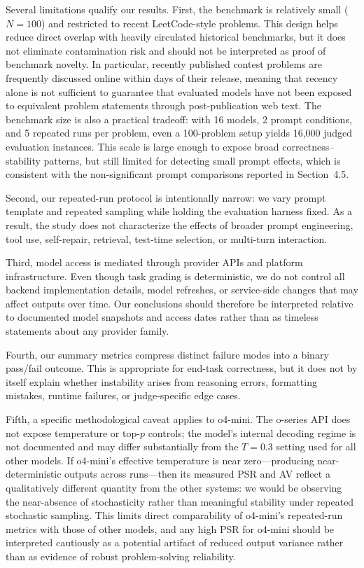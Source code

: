\documentclass[11pt,a4paper]{article}
\begin{document}
Several limitations qualify our results. First, the benchmark is relatively small ($N=100$) and restricted to recent LeetCode-style problems. This design helps reduce direct overlap with heavily circulated historical benchmarks, but it does not eliminate contamination risk and should not be interpreted as proof of benchmark novelty. In particular, recently published contest problems are frequently discussed online within days of their release, meaning that recency alone is not sufficient to guarantee that evaluated models have not been exposed to equivalent problem statements through post-publication web text. The benchmark size is also a practical tradeoff: with 16 models, 2 prompt conditions, and 5 repeated runs per problem, even a 100-problem setup yields 16{,}000 judged evaluation instances. This scale is large enough to expose broad correctness--stability patterns, but still limited for detecting small prompt effects, which is consistent with the non-significant prompt comparisons reported in Section~4.5.

Second, our repeated-run protocol is intentionally narrow: we vary prompt template and repeated sampling while holding the evaluation harness fixed. As a result, the study does not characterize the effects of broader prompt engineering, tool use, self-repair, retrieval, test-time selection, or multi-turn interaction.

Third, model access is mediated through provider APIs and platform infrastructure. Even though task grading is deterministic, we do not control all backend implementation details, model refreshes, or service-side changes that may affect outputs over time. Our conclusions should therefore be interpreted relative to documented model snapshots and access dates rather than as timeless statements about any provider family.

Fourth, our summary metrics compress distinct failure modes into a binary pass/fail outcome. This is appropriate for end-task correctness, but it does not by itself explain whether instability arises from reasoning errors, formatting mistakes, runtime failures, or judge-specific edge cases.

Fifth, a specific methodological caveat applies to o4-mini. The o-series API does not expose temperature or top-$p$ controls; the model's internal decoding regime is not documented and may differ substantially from the $T=0.3$ setting used for all other models. If o4-mini's effective temperature is near zero---producing near-deterministic outputs across runs---then its measured PSR and AV reflect a qualitatively different quantity from the other systems: we would be observing the near-absence of stochasticity rather than meaningful stability under repeated stochastic sampling. This limits direct comparability of o4-mini's repeated-run metrics with those of other models, and any high PSR for o4-mini should be interpreted cautiously as a potential artifact of reduced output variance rather than as evidence of robust problem-solving reliability.
\end{document}
